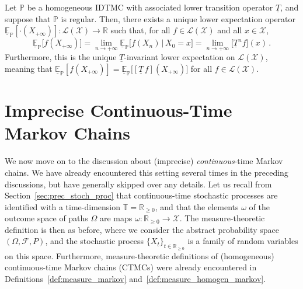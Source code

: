 \documentclass[graybox]{svmult}
\newcommand{\reals}{\mathbb{R}}
\newcommand{\realsnonneg}{\reals_{\geq 0}}
\newcommand{\states}{\mathcal{X}}
\newcommand{\gambles}{\mathcal{L}}
\newcommand{\gamblesX}{\gambles(\states)}
\newcommand{\timedim}{\mathbb{T}}
\begin{document}
\begin{theorem}\label{theo:idtmc_ergodic_simple}
Let $\mathbb{P}$ be a homogeneous IDTMC with associated lower transition operator $\underline{T}$, and suppose that $\mathbb{P}$ is regular. Then, there exists a unique lower expectation operator $\underline{\mathbb{E}}_\mathbb{P}[\cdot(X_{+\infty})]:\gamblesX\to\reals$ such that, for all $f\in\gamblesX$ and all $x\in\states$,
\begin{equation*}
\underline{\mathbb{E}}_\mathbb{P}\bigl[f(X_{+\infty})\bigr] = \lim_{n\to+\infty} \underline{\mathbb{E}}_\mathbb{P}\bigl[f(X_n)\,\vert\,X_0=x\bigr] = \lim_{n\to+\infty} \bigl[\underline{T}^nf\bigr](x)\,.
\end{equation*}
Furthermore, this is the unique $\underline{T}$-invariant lower expectation on $\gamblesX$, meaning that $\underline{\mathbb{E}}_\mathbb{P}[f(X_{+\infty})]= \underline{\mathbb{E}}_\mathbb{P}\bigl[[\underline{T}\,f](X_{+\infty})\bigr]$ for all $f\in\gamblesX$.
\end{theorem}

\section{Imprecise Continuous-Time Markov Chains}\label{sec:ictmc}


We now move on to the discussion about (imprecise) \emph{continuous}-time Markov chains. We have already encountered this setting several times in the preceding discussions, but have generally skipped over any details. Let us recall from Section~\ref{sec:prec_stoch_proc} that continuous-time stochastic processes are identified with a time-dimension $\timedim=\realsnonneg$, and that the elements $\omega$ of the outcome space of paths $\Omega$ are maps $\omega:
\realsnonneg\to\states$. The measure-theoretic definition is then as before, where we consider the abstract probability space $(\Omega,\mathcal{F},P)$, and the stochastic process $\{X_t\}_{t\in\realsnonneg}$ is a family of random variables on this space. Furthermore, measure-theoretic definitions of (homogeneous) continuous-time Markov chains (CTMCs) were already encountered in Definitions~\ref{def:measure_markov} and~\ref{def:measure_homogen_markov}.
\end{document}

